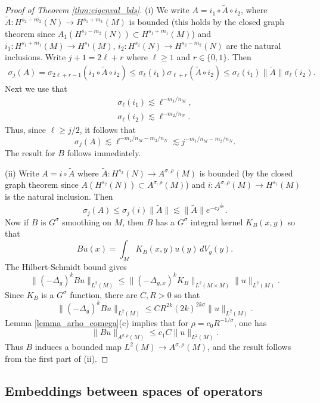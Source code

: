 \documentclass[12pt,twoside]{amsart}
\numberwithin{equation}{section}
\renewcommand{\leq}{\leqslant}
\renewcommand{\geq}{\geqslant}
\newcommand{\norm}[1]{\lVert #1 \rVert}         %
\begin{document}
\begin{proof}[Proof of Theorem \ref{thm:eigenval_bds}]
(i) We write $A = i_1 \circ \tilde{A} \circ i_2$, where $\tilde{A}: H^{s_2-m_2}(N) \to H^{s_1+m_1}(M)$ is bounded (this holds by the closed graph theorem since $A_1(H^{s_2-m_2}(N)) \subset H^{s_1+m_1}(M)$) and $i_1: H^{s_1+m_1}(M) \to H^{s_1}(M)$, $i_2: H^{s_2}(N) \to H^{s_2-m_2}(N)$ are the natural inclusions. Write $j + 1 = 2 \ell + r$ where $\ell \geq 1$ and $r \in \{ 0, 1 \}$. Then 
\begin{align*}
\sigma_j(A) = \sigma_{2\ell+r-1}(i_1 \circ \tilde{A} \circ i_2) \leq \sigma_{\ell}(i_1) \sigma_{\ell+r}(\tilde{A} \circ i_2) \leq \sigma_{\ell}(i_1) \norm{\tilde{A}} \sigma_{\ell}(i_2).
\end{align*}
Next we use that 
\begin{gather*}
\sigma_{\ell}(i_1) \lesssim \ell^{-m_1/n_M}, \\
\sigma_{\ell}(i_2) \lesssim \ell^{-m_2/n_N}.
\end{gather*}
Thus, since $\ell \geq j/2$, it follows that 
\[
\sigma_j(A) \lesssim \ell^{-m_1/n_M-m_2/n_N} \lesssim j^{-m_1/n_M-m_2/n_N}.
\]
The result for $B$ follows immediately.

(ii) Write $A = i \circ \tilde{A}$ where $\tilde{A}: H^{s_2}(N) \to A^{\sigma,\rho}(M)$ is bounded (by the closed graph theorem since $A(H^{s_2}(N)) \subset A^{\sigma,\rho}(M)$) and $i: A^{\sigma,\rho}(M) \to H^{s_1}(M)$ is the natural inclusion. Then 
\[
\sigma_j(A) \leq \sigma_j(i) \norm{\tilde{A}} \lesssim \norm{\tilde{A}} e^{-cj^{\frac{1}{n\sigma}}}.
\]
Now if $B$ is $G^{\sigma}$ smoothing on $M$, then $B$ has a $G^{\sigma}$ integral kernel $K_B(x,y)$ so that 
\[
Bu(x) = \int_M K_B(x,y) u(y) \,dV_g(y).
\]
The Hilbert-Schmidt bound gives 
\[
\norm{(-\Delta_g)^k Bu}_{L^2(M)} \leq \norm{(-\Delta_{g,x})^k K_B}_{L^2(M \times M)} \norm{u}_{L^2(M)}.
\]
Since $K_B$ is a $G^{\sigma}$ function, there are $C, R > 0$ so that 
\[
\norm{(-\Delta_g)^k Bu}_{L^2(M)} \leq C R^{2k} (2k)^{2k\sigma} \norm{u}_{L^2(M)}.
\]
Lemma \ref{lemma_arho_comega}(c) implies that for $\rho = c_0 R^{-1/\sigma}$, one has 
\[
\norm{Bu}_{A^{\sigma,\rho}(M)} \leq c_1 C \norm{u}_{L^2(M)}.
\]
Thus $B$ induces a bounded map $L^2(M) \to A^{\sigma,\rho}(M)$, and the result follows from the first part of (ii).
\end{proof}

\subsection{Embeddings between spaces of operators}
\label{sec:ops}
\end{document}
